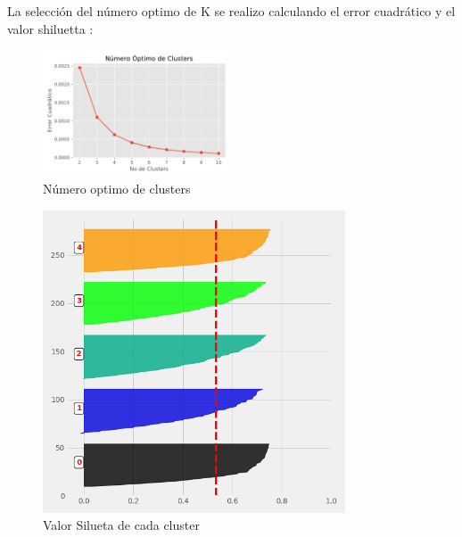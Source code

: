 La selección del número optimo de K se realizo calculando el error cuadrático y el valor shiluetta  :

\begin{figure}[H] 
	\centering
	\includegraphics[width=0.5\textwidth]{Kap4/Clusters.pdf}
	\caption{Número optimo de clusters} 
	\label{fig:Clusters}
\end{figure}

\begin{figure}[H] 
	\centering
	\includegraphics[width=0.8\textwidth]{Kap4/S}
	\caption{Valor Silueta de cada cluster} 
	\label{fig:S}
\end{figure}

